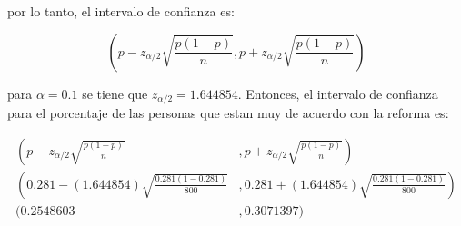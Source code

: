 por lo tanto, el intervalo de confianza es:

\begin{equation*}
    \left ( p - z_{\alpha/2} \sqrt{ \frac{p(1-p)}{n}},p + z_{\alpha/2} \sqrt{ \frac{p(1-p)}{n}}\right )
\end{equation*}

para $\alpha=0.1$ se tiene que $z_{\alpha/2} = 1.644854$. Entonces, el intervalo de confianza para el porcentaje de las personas que estan muy de acuerdo con la reforma es:

\begin{align*}
    \left ( p - z_{\alpha/2} \sqrt{\frac{p(1-p)}{n}}\right .              & ,\left .p + z_{\alpha/2} \sqrt{ \frac{p(1-p)}{n}}\right )              \\
    \left (0.281 - (1.644854) \sqrt{ \frac{0.281(1-0.281)}{800}} \right . & \left ., 0.281 + (1.644854) \sqrt{\frac{0.281(1-0.281)}{800}} \right ) \\
    (0.2548603                                                            & ,0.3071397)
\end{align*}
